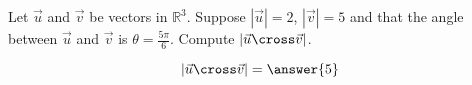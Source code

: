 \documentclass{ximera}
\author{Gregory Hartman \and Matthew Carr}
\begin{document}
\begin{exercise}



Let $\vec{u}$ and $\vec{v}$ be vectors in $\mathbb{R}^3$. Suppose $|\vec{u}|=2$, $|\vec{v}|=5$ and that the angle between $\vec{u}$ and $\vec{v}$ is $\theta=\frac{5\pi}{6}$. Compute $|\vec{u}\cross\vec{v}|$.

\begin{prompt}
\[
|\vec{u}\cross\vec{v}|=\answer{5}
\]
\end{prompt}


\end{exercise}
\end{document}

